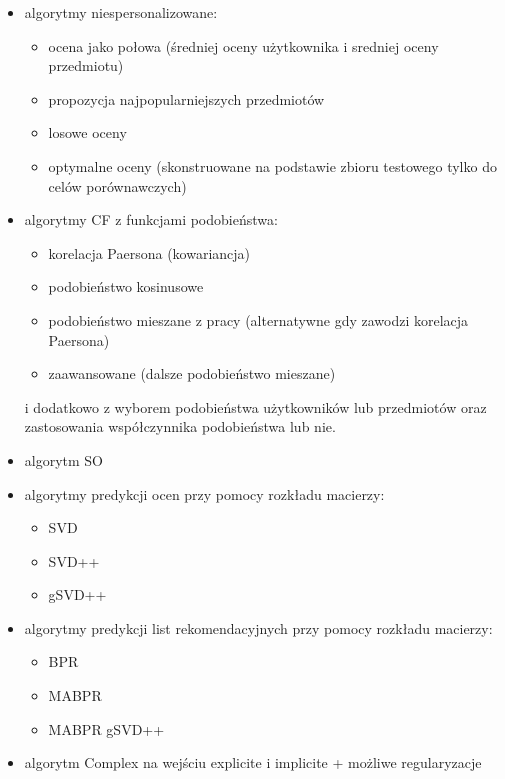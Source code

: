 \documentclass{pracamgr}
\begin{document}
   \begin{itemize}\itemsep1pt \parskip0pt 
    \item algorytmy niespersonalizowane:
     \begin{itemize}\itemsep1pt \parskip0pt 
      \item ocena jako połowa (średniej oceny użytkownika i sredniej oceny przedmiotu)
      \item propozycja najpopularniejszych przedmiotów
      \item losowe oceny
      \item optymalne oceny (skonstruowane na podstawie zbioru testowego tylko do celów porównawczych)
     \end{itemize}
    \item algorytmy CF z funkcjami podobieństwa:
     \begin{itemize}\itemsep1pt \parskip0pt 
      \item korelacja Paersona (kowariancja)
      \item podobieństwo kosinusowe
      \item podobieństwo mieszane z pracy \cite{221} (alternatywne gdy zawodzi korelacja Paersona)
      \item zaawansowane (dalsze podobieństwo mieszane)
     \end{itemize}
     i dodatkowo z wyborem podobieństwa użytkowników lub przedmiotów oraz zastosowania współczynnika podobieństwa lub nie.
    \item algorytm SO
    \item algorytmy predykcji ocen przy pomocy rozkładu macierzy:
     \begin{itemize}\itemsep1pt \parskip0pt 
      \item SVD
      \item SVD++
      \item gSVD++
     \end{itemize}
    \item algorytmy predykcji list rekomendacyjnych przy pomocy rozkładu macierzy:
     \begin{itemize}\itemsep1pt \parskip0pt 
      \item BPR
      \item MABPR
      \item MABPR gSVD++
     \end{itemize}   
    \item algorytm Complex na wejściu explicite i implicite + możliwe regularyzacje
   \end{itemize}  
\end{document}
